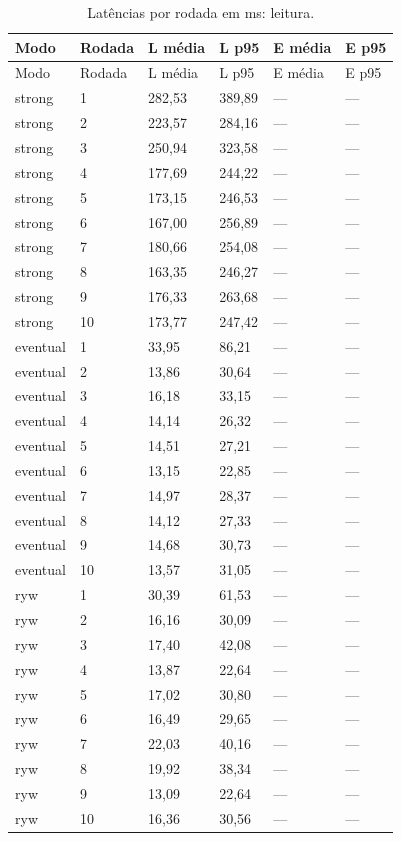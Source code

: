 \begingroup\small\setlength{\tabcolsep}{4pt}
\begin{longtable}{llllll}
\caption{Latências por rodada em ms: leitura.}\\
\toprule
Modo & Rodada & L média & L p95 & E média & E p95\\\midrule\endfirsthead
\toprule
Modo & Rodada & L média & L p95 & E média & E p95\\\midrule\endhead
\bottomrule\endfoot
strong & 1 & 282,53 & 389,89 & --- & ---\\
strong & 2 & 223,57 & 284,16 & --- & ---\\
strong & 3 & 250,94 & 323,58 & --- & ---\\
strong & 4 & 177,69 & 244,22 & --- & ---\\
strong & 5 & 173,15 & 246,53 & --- & ---\\
strong & 6 & 167,00 & 256,89 & --- & ---\\
strong & 7 & 180,66 & 254,08 & --- & ---\\
strong & 8 & 163,35 & 246,27 & --- & ---\\
strong & 9 & 176,33 & 263,68 & --- & ---\\
strong & 10 & 173,77 & 247,42 & --- & ---\\
eventual & 1 & 33,95 & 86,21 & --- & ---\\
eventual & 2 & 13,86 & 30,64 & --- & ---\\
eventual & 3 & 16,18 & 33,15 & --- & ---\\
eventual & 4 & 14,14 & 26,32 & --- & ---\\
eventual & 5 & 14,51 & 27,21 & --- & ---\\
eventual & 6 & 13,15 & 22,85 & --- & ---\\
eventual & 7 & 14,97 & 28,37 & --- & ---\\
eventual & 8 & 14,12 & 27,33 & --- & ---\\
eventual & 9 & 14,68 & 30,73 & --- & ---\\
eventual & 10 & 13,57 & 31,05 & --- & ---\\
ryw & 1 & 30,39 & 61,53 & --- & ---\\
ryw & 2 & 16,16 & 30,09 & --- & ---\\
ryw & 3 & 17,40 & 42,08 & --- & ---\\
ryw & 4 & 13,87 & 22,64 & --- & ---\\
ryw & 5 & 17,02 & 30,80 & --- & ---\\
ryw & 6 & 16,49 & 29,65 & --- & ---\\
ryw & 7 & 22,03 & 40,16 & --- & ---\\
ryw & 8 & 19,92 & 38,34 & --- & ---\\
ryw & 9 & 13,09 & 22,64 & --- & ---\\
ryw & 10 & 16,36 & 30,56 & --- & ---\\
\end{longtable}
\endgroup

